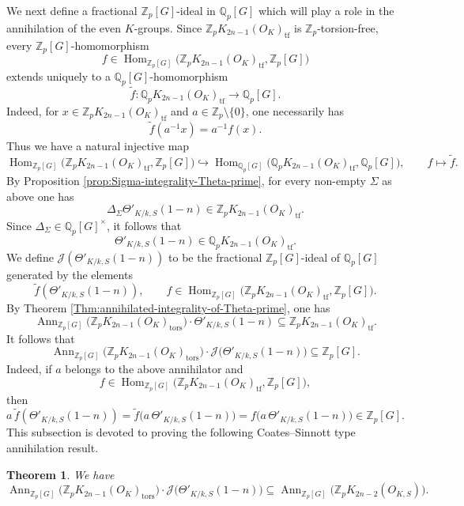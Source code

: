 \documentclass[a4paper,11pt]{article}
\newtheorem{theorem}{Theorem}[section]
\begin{document}
We next define a fractional \(\mathbb Z_p[G]\)-ideal in \(\mathbb Q_p[G]\)
which will play a role in the annihilation of the even \(K\)-groups. Since \(\mathbb Z_pK_{2n-1}(O_K)_{\mathrm{tf}}\) is
\(\mathbb Z_p\)-torsion-free, every \(\mathbb Z_p[G]\)-homomorphism
\[
f\in
\operatorname{Hom}_{\mathbb Z_p[G]}
\bigl(
\mathbb Z_pK_{2n-1}(O_K)_{\mathrm{tf}},
\mathbb Z_p[G]
\bigr)
\]
extends uniquely to a \(\mathbb Q_p[G]\)-homomorphism
\[
\widetilde f\colon
\mathbb Q_pK_{2n-1}(O_K)_{\mathrm{tf}}
\longrightarrow
\mathbb Q_p[G].
\]
Indeed, for \(x\in \mathbb Z_pK_{2n-1}(O_K)_{\mathrm{tf}}\) and
\(a\in\mathbb Z_p\setminus\{0\}\), one necessarily has
\[
\widetilde f(a^{-1}x)=a^{-1}f(x).
\]
Thus we have a natural injective map
\[
\operatorname{Hom}_{\mathbb Z_p[G]}
\bigl(
\mathbb Z_pK_{2n-1}(O_K)_{\mathrm{tf}},
\mathbb Z_p[G]
\bigr)
\hookrightarrow
\operatorname{Hom}_{\mathbb Q_p[G]}
\bigl(
\mathbb Q_pK_{2n-1}(O_K)_{\mathrm{tf}},
\mathbb Q_p[G]
\bigr),
\qquad
f\longmapsto \widetilde f.
\]
By Proposition \ref{prop:Sigma-integrality-Theta-prime}, for every non-empty
\(\Sigma\) as above one has
\[
\Delta_\Sigma\Theta'_{K/k,S}(1-n)
\in
\mathbb Z_pK_{2n-1}(O_K)_{\mathrm{tf}}.
\]
Since \(\Delta_\Sigma\in\mathbb Q_p[G]^\times\), it follows that
\[
\Theta'_{K/k,S}(1-n)
\in
\mathbb Q_pK_{2n-1}(O_K)_{\mathrm{tf}}.
\]
We define \(\mathcal J(\Theta'_{K/k,S}(1-n))\) to be the fractional
\(\mathbb Z_p[G]\)-ideal of \(\mathbb Q_p[G]\) generated by the elements
\[
\widetilde f(\Theta'_{K/k,S}(1-n)),
\qquad
f\in
\operatorname{Hom}_{\mathbb Z_p[G]}
\bigl(
\mathbb Z_pK_{2n-1}(O_K)_{\mathrm{tf}},
\mathbb Z_p[G]
\bigr).
\]
By Theorem \ref{Thm:annihilated-integrality-of-Theta-prime}, one has
\[
\operatorname{Ann}_{\mathbb Z_p[G]}
\bigl(\mathbb Z_pK_{2n-1}(O_K)_{\mathrm{tors}}\bigr)
\cdot
\Theta'_{K/k,S}(1-n)
\subseteq
\mathbb Z_pK_{2n-1}(O_K)_{\mathrm{tf}}.
\]
It follows that
\[
\operatorname{Ann}_{\mathbb Z_p[G]}
\bigl(\mathbb Z_pK_{2n-1}(O_K)_{\mathrm{tors}}\bigr)
\cdot
\mathcal J\bigl(\Theta'_{K/k,S}(1-n)\bigr)
\subseteq
\mathbb Z_p[G].
\]
Indeed, if \(a\) belongs to the above annihilator and
\[
f\in
\operatorname{Hom}_{\mathbb Z_p[G]}
\bigl(
\mathbb Z_pK_{2n-1}(O_K)_{\mathrm{tf}},
\mathbb Z_p[G]
\bigr),
\]
then
\[
a\,\widetilde f(\Theta'_{K/k,S}(1-n))
=
\widetilde f\bigl(a\,\Theta'_{K/k,S}(1-n)\bigr)
=
f\bigl(a\,\Theta'_{K/k,S}(1-n)\bigr)
\in
\mathbb Z_p[G].
\]
This subsection is devoted to proving the following Coates--Sinnott type
annihilation result.
\begin{theorem}
\label{Main_Theo_02}
We have
\[
\operatorname{Ann}_{\mathbb Z_p[G]}
\bigl(\mathbb Z_pK_{2n-1}(O_K)_{\mathrm{tors}}\bigr)
\cdot
\mathcal J\bigl(\Theta'_{K/k,S}(1-n)\bigr)
\subseteq
\operatorname{Ann}_{\mathbb Z_p[G]}
\bigl(\mathbb Z_pK_{2n-2}(O_{K,S})\bigr).
\]
\end{theorem}
\end{document}
